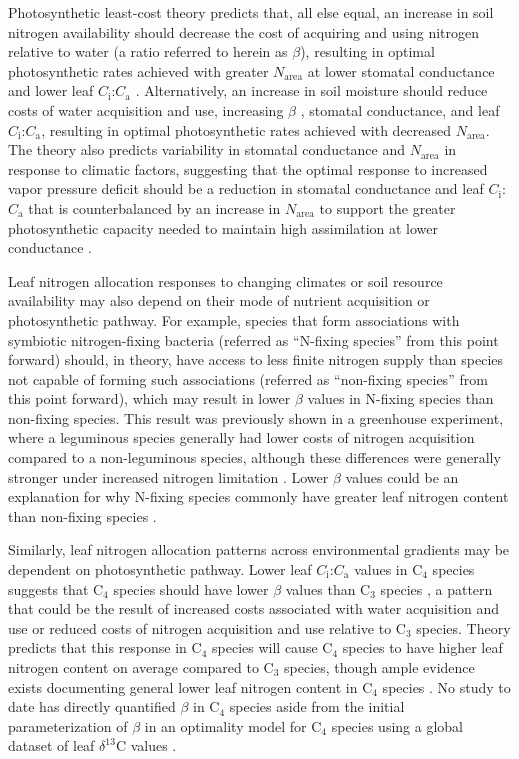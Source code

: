 Photosynthetic least-cost theory predicts that, all else equal, an increase in soil nitrogen availability should decrease the cost of acquiring and using nitrogen relative to water (a ratio referred to herein as $\beta$), resulting in optimal photosynthetic rates achieved with greater $N_\mathrm{area}$ at lower stomatal conductance and lower leaf $C_\mathrm{i}$:$C_\mathrm{a}$ . Alternatively, an increase in soil moisture should reduce costs of water acquisition and use, increasing $\beta$ , stomatal conductance, and leaf $C_\mathrm{i}$:$C_\mathrm{a}$, resulting in optimal photosynthetic rates achieved with decreased $N_\mathrm{area}$. The theory also predicts variability in stomatal conductance and $N_\mathrm{area}$ in response to climatic factors, suggesting that the optimal response to increased vapor pressure deficit should be a reduction in stomatal conductance and leaf $C_\mathrm{i}$:$C_\mathrm{a}$ that is counterbalanced by an increase in $N_\mathrm{area}$ to support the greater photosynthetic capacity needed to maintain high assimilation at lower conductance .

Leaf nitrogen allocation responses to changing climates or soil resource availability may also depend on their mode of nutrient acquisition or photosynthetic pathway. For example, species that form associations with symbiotic nitrogen-fixing bacteria (referred as “N-fixing species” from this point forward) should, in theory, have access to less finite nitrogen supply than species not capable of forming such associations (referred as “non-fixing species” from this point forward), which may result in lower $\beta$ values in N-fixing species than non-fixing species. This result was previously shown in a greenhouse experiment, where a leguminous species generally had lower costs of nitrogen acquisition compared to a non-leguminous species, although these differences were generally stronger under increased nitrogen limitation . Lower $\beta$ values could be an explanation for why N-fixing species commonly have greater leaf nitrogen content than non-fixing species .

Similarly, leaf nitrogen allocation patterns across environmental gradients may be dependent on photosynthetic pathway. Lower leaf $C_\mathrm{i}$:$C_\mathrm{a}$ values in C$_4$ species suggests that C$_4$ species should have lower $\beta$ values than C$_3$ species , a pattern that could be the result of increased costs associated with water acquisition and use or reduced costs of nitrogen acquisition and use relative to C$_3$ species. Theory predicts that this response in C$_4$ species will cause C$_4$ species to have higher leaf nitrogen content on average compared to C$_3$ species, though ample evidence exists documenting general lower leaf nitrogen content in C$_4$ species . No study to date has directly quantified $\beta$ in C$_4$ species aside from the initial parameterization of $\beta$ in an optimality model for C$_4$ species  using a global dataset of leaf $\delta^{13}$C values .

